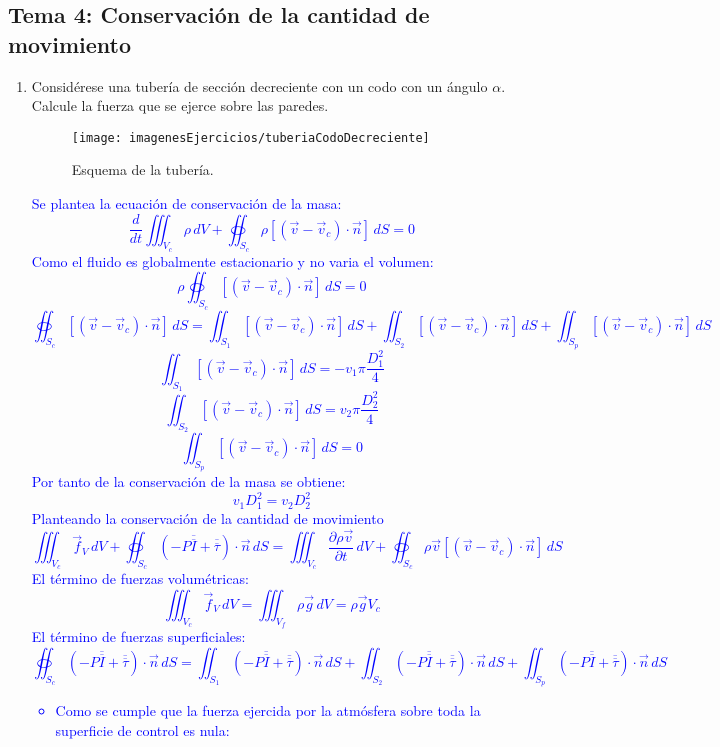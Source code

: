 \subsection{Tema 4: Conservación de la cantidad de movimiento}
\begin{enumerate}
	\item Considérese una tubería de sección decreciente con un codo con un ángulo $\alpha$. Calcule la fuerza que se ejerce sobre las paredes.
	\begin{figure}[H]
		\centering
		\texttt{[image: imagenesEjercicios/tuberiaCodoDecreciente]}
		\caption{Esquema de la tubería.}
		\label{fig:tuberiacododecreciente}
	\end{figure}
	\textcolor{blue}{
	Se plantea la ecuación de conservación de la masa:  
	\[\frac{d}{dt}\iiint_{V_c}\rho\,dV+\oiint_{S_c} \rho\left[(\vec{v}-\vec{v}_c)\cdot\vec{n}\right] \,dS=0\]
	Como el fluido es globalmente estacionario y no varia el volumen:
	\[\rho\oiint_{S_c} \left[(\vec{v}-\vec{v}_c)\cdot\vec{n}\right] \,dS=0\]
	\[\oiint_{S_c} \left[(\vec{v}-\vec{v}_c)\cdot\vec{n}\right] \,dS=
	\iint_{S_1} \left[(\vec{v}-\vec{v}_c)\cdot\vec{n}\right] \,dS
	+
	\iint_{S_2} \left[(\vec{v}-\vec{v}_c)\cdot\vec{n}\right] \,dS
	+
	\iint_{S_p} \left[(\vec{v}-\vec{v}_c)\cdot\vec{n}\right] \,dS\]
	\[\iint_{S_1} \left[(\vec{v}-\vec{v}_c)\cdot\vec{n}\right] \,dS=-v_1\pi\frac{D_1^2}{4}\]
	\[\iint_{S_2} \left[(\vec{v}-\vec{v}_c)\cdot\vec{n}\right] \,dS=v_2\pi\frac{D_2^2}{4}\]
	\[\iint_{S_p} \left[(\vec{v}-\vec{v}_c)\cdot\vec{n}\right] \,dS=0\]
	Por tanto de la conservación de la masa se obtiene:
	\[v_1D_1^2=v_2D_2^2\]
	Planteando la conservación de la cantidad de movimiento
	\[\iiint_{V_c}\vec{f}_V\,dV
	+
	\oiint_{S_c}\left(-P\overline{\overline{I}}+\overline{\overline{\tau}}\right)\cdot\vec{n}\,dS=
	\iiint_{V_c}\frac{\partial \rho\vec{v}}{\partial t}\,dV
	+\oiint_{S_c}\rho\vec{v}\left[\left(\vec{v}-\vec{v}_c\right)\cdot\vec{n}\right]\,dS\]
	El término de fuerzas volumétricas:
	\[\iiint_{V_c}\vec{f}_V\,dV=\iiint_{V_f}\rho\vec{g}\,dV=\rho \vec{g}V_c\]
	El término de fuerzas superficiales:
	\[\oiint_{S_c}\left(-P\overline{\overline{I}}+\overline{\overline{\tau}}\right)\cdot\vec{n}\,dS=
	\iint_{S_1}\left(-P\overline{\overline{I}}+\overline{\overline{\tau}}\right)\cdot\vec{n}\,dS
	+
	\iint_{S_2}\left(-P\overline{\overline{I}}+\overline{\overline{\tau}}\right)\cdot\vec{n}\,dS
	+
	\iint_{S_p}\left(-P\overline{\overline{I}}+\overline{\overline{\tau}}\right)\cdot\vec{n}\,dS
	\]
	\begin{itemize}
		\item 	Como se cumple que la fuerza ejercida por la atmósfera sobre toda la superficie de control es nula:

\end{itemize}}
\end{enumerate}
